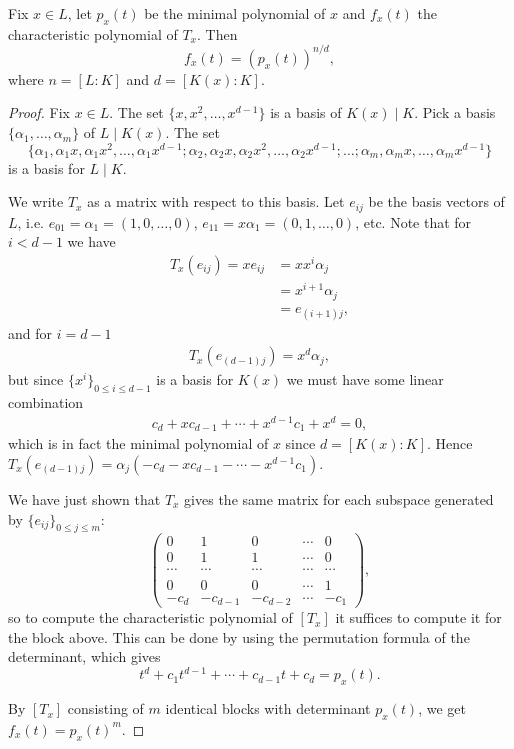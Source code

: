 \begin{proposition}
	Fix $x\in L$, let $p_x(t)$ be the minimal polynomial of $x$ and $f_x(t)$ the characteristic polynomial of $T_x$. Then
	\[
		f_x(t) = (p_x(t))^{n/d},
	\]
	where $n=[L:K]$ and $d=[K(x):K]$.
\end{proposition}
\begin{proof}
	Fix $x\in L$. The set $\{x,x^2,\dots,x^{d-1}\}$ is a basis of $K(x)\mid K$. Pick a basis $\{\alpha_1,\dots,\alpha_m\}$ of $L\mid K(x)$. The set 
	\[
		\{\alpha_1, \alpha_1 x,\alpha_1 x^2, \dots, \alpha_1 x^{d-1}; \alpha_2, \alpha_2 x, \alpha_2 x^2, \dots, \alpha_2 x^{d-1}; \dots ; \alpha_m, \alpha_m x, \dots, \alpha_m x^{d-1}\}
	\]
	is a basis for $L\mid K$.

	We write $T_x$ as a matrix with respect to this basis. Let $e_{ij}$ be the basis vectors of $L$, i.e. $e_{01} = \alpha_1 = (1,0,\dots,0)$, $e_{11} = x \alpha_1 = (0,1,\dots,0)$, etc. Note that for $i<d-1$ we have
	\begin{align*}
		T_x(e_{ij}) = x e_{ij} &= x x^i \alpha_j\\
			&= x^{i+1} \alpha_j\\
			&= e_{(i+1)j},
	\end{align*}
	and for $i=d-1$
	\begin{align*}
		T_x(e_{(d-1)j}) = x^d \alpha_j,
	\end{align*}
	but since $\{x^i\}_{0\leq i \leq d-1}$ is a basis for $K(x)$ we must have some linear combination 
	\begin{align*}
		c_d + x c_{d-1} + \cdots + x^{d-1} c_1 + x^d = 0,
	\end{align*}
	which is in fact the minimal polynomial of $x$ since $d=[K(x):K]$. Hence $T_x(e_{(d-1)j}) = \alpha_j (-c_d - x c_{d-1} - \cdots - x^{d-1} c_1)$.
	
	We have just shown that $T_x$ gives the same matrix for each subspace generated by $\{e_{ij}\}_{0\leq j\leq m}$:
	\[
	\begin{pmatrix}
		0 & 1 & 0 & \cdots & 0\\
		0 & 1 & 1 & \cdots & 0\\
		\cdots & \cdots & \cdots & \cdots & \cdots\\
		0 & 0 & 0 & \cdots & 1\\
		-c_d & -c_{d-1} & -c_{d-2} & \cdots & -c_1
	\end{pmatrix},
	\]
	so to compute the characteristic polynomial of $[T_x]$ it suffices to compute it for the block above. This can be done by using the permutation formula of the determinant, which gives
	\[
		t^d + c_1 t^{d-1} + \cdots + c_{d-1} t + c_d = p_x(t).
	\]

	By $[T_x]$ consisting of $m$ identical blocks with determinant $p_x(t)$, we get $f_x(t)=p_x(t)^m$.

\end{proof}

